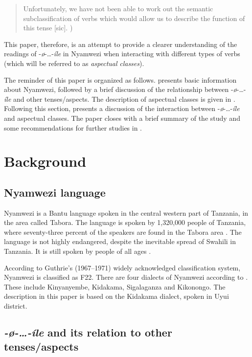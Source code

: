 \documentclass[output=paper]{langscibook}
\begin{document}
\begin{quote}
Unfortunately, we have not been able to work out the semantic subclassification of verbs which would allow us to describe the function of this tense [sic]. \cite[126]{Maganga1992})
\end{quote}

This paper, therefore, is an attempt to provide a clearer understanding of the readings of -\textit{ø}-…-\textit{íle} in Nyamwezi when interacting with different types of verbs (which will be referred to as \textit{aspectual} \textit{classes}). 

The reminder of this paper is organized as follows.  presents basic information about Nyamwezi, followed by a brief discussion of the relationship between -\textit{ø}-…-\textit{íle} and other tenses/aspects. The description of aspectual classes is given in . Following this section,  presents a discussion of the interaction between -\textit{ø}-…-\textit{íle} and aspectual classes. The paper closes with a brief summary of the study and some recommendations for further studies in . 

 
\section{Background} 
 \label{sec:kanijo:2}
 
\subsection{Nyamwezi language} 

Nyamwezi is a Bantu language spoken in the central western part of Tanzania, in the area called Tabora. The language is spoken by 1,320,000 people of Tanzania, where seventy-three percent of the speakers are found in the Tabora area \citep{Lewis2013}. The language is not highly endangered, despite the inevitable spread of Swahili in Tanzania. It is still spoken by people of all ages \citep{Lewis2013}. 

According to Guthrie’s (1967–1971) widely acknowledged classification system, Nyamwezi is classified as F22. There are four dialects of Nyamwezi according to \citet{Masele2001}. These include Kinyanyembe, Kidakama, Sigalaganza and Kikonongo. The description in this paper is based on the Kidakama dialect, spoken in Uyui district.

\subsection{\textit{-}\textit{ø-…-íle} and its relation to other tenses/aspects}
\end{document}
